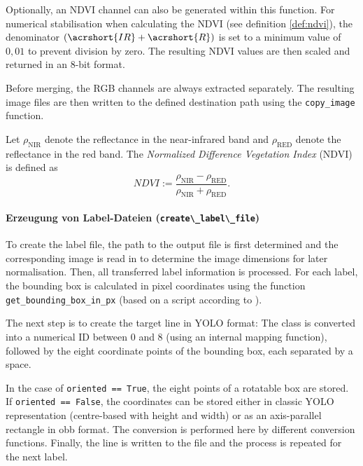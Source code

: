 Optionally, an \acrshort{NDVI} channel can also be generated within this function. For numerical stabilisation when calculating the \acrshort{NDVI} (see definition \ref{def:ndvi}), the denominator $(\acrshort{IR} + \acrshort{R})$ is set to a minimum value of $0{,}01$ to prevent division by zero. The resulting \acrshort{NDVI} values are then scaled and returned in an 8-bit format.

Before merging, the \acrshort{RGB} channels are always extracted separately. The resulting image files are then written to the defined destination path using the \lstinline|copy_image| function.



\begin{definition}
Let $\rho_{\text{NIR}}$ denote the reflectance in the near-infrared band and 
$\rho_{\text{RED}}$ denote the reflectance in the red band. 
The \textit{Normalized Difference Vegetation Index} (NDVI) is defined as
\begin{equation}
NDVI := \frac{\rho_{\text{NIR}} - \rho_{\text{RED}}}{\rho_{\text{NIR}} + \rho_{\text{RED}}}.
\end{equation}
\label{def:ndvi}
\end{definition}



\paragraph{Erzeugung von Label-Dateien (\lstinline|create\_label\_file|)}
\hypertarget{par:create_label_file}{}

To create the label file, the path to the output file is first determined and the corresponding image is read in to determine the image dimensions for later normalisation. Then, all transferred label information is processed. For each label, the bounding box is calculated in pixel coordinates using the function \lstinline|get_bounding_box_in_px| (based on a script according to \citeauthor{Razakarivony2015}).

The next step is to create the target line in \acrshort{YOLO} format: The class is converted into a numerical \acrshort{ID} between 0 and 8 (using an internal mapping function), followed by the eight coordinate points of the bounding box, each separated by a space.

In the case of \lstinline|oriented == True|, the eight points of a rotatable box are stored. If \lstinline|oriented == False|, the coordinates can be stored either in classic \acrshort{YOLO} representation (centre-based with height and width) or as an axis-parallel rectangle in \acrshort{obb} format. The conversion is performed here by different conversion functions. Finally, the line is written to the file and the process is repeated for the next label.

